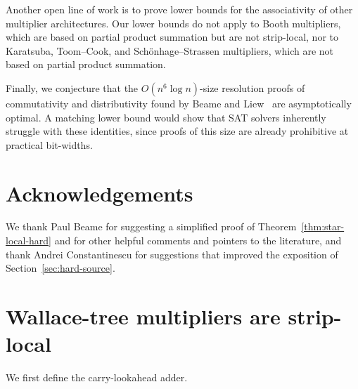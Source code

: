 \documentclass[11pt]{article}
\theoremstyle{definition}
\theoremstyle{remark}
\begin{document}
Another open line of work is to prove lower bounds for the associativity of other multiplier architectures. Our lower bounds do not apply to Booth multipliers, which are based on partial product summation but are not strip-local, nor to Karatsuba, Toom--Cook, and Sch\"onhage--Strassen multipliers, which are not based on partial product summation.

Finally, we conjecture that the $O(n^6\log n)$-size resolution proofs of commutativity and distributivity found by Beame and Liew~\cite{beame-liew} are asymptotically optimal. A matching lower bound would show that SAT solvers inherently struggle with these identities, since proofs of this size are already prohibitive at practical bit-widths.

\section*{Acknowledgements}

We thank Paul Beame for suggesting a simplified proof of Theorem~\ref{thm:star-local-hard} and for other helpful comments and pointers to the literature, and thank Andrei Constantinescu for suggestions that improved the exposition of Section~\ref{sec:hard-source}.

\appendix
\section{Wallace-tree multipliers are strip-local}
\label{app:architectures}

We first define the carry-lookahead adder.
\end{document}
